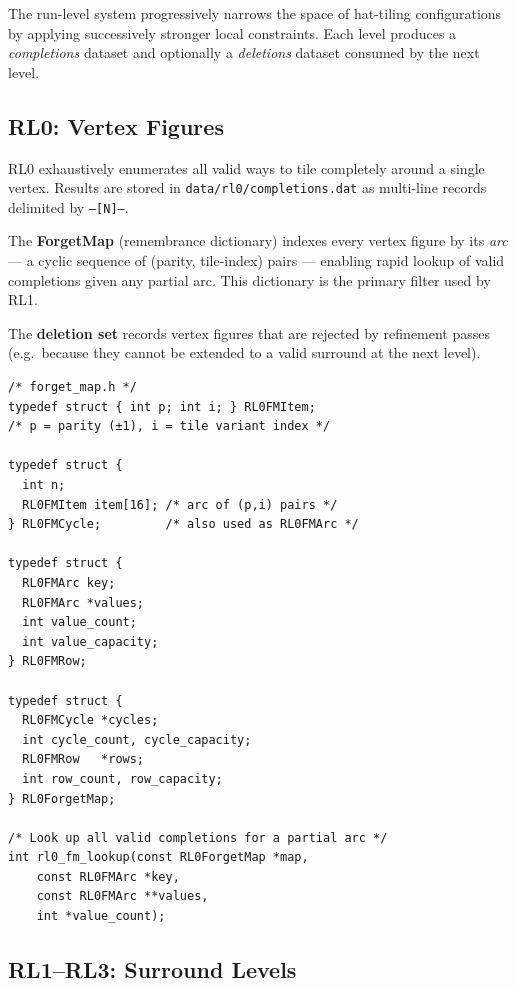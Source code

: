 \documentclass[10pt,a4paper]{article}
\newcommand{\code}[1]{\texttt{\small #1}}
\newcommand{\file}[1]{\texttt{\footnotesize #1}}
\begin{document}
The run-level system progressively narrows the space of hat-tiling
configurations by applying successively stronger local constraints.
Each level produces a \emph{completions} dataset and optionally a
\emph{deletions} dataset consumed by the next level.

\subsection{RL0: Vertex Figures}

\begin{tcolorbox}[dualbox, title=RL0 — Vertex Figure Generation — \file{src/rl0/}]
  RL0 exhaustively enumerates all valid ways to tile completely around
  a single vertex.  Results are stored in \file{data/rl0/completions.dat}
  as multi-line records delimited by \code{---[N]---}.

  The \textbf{ForgetMap} (remembrance dictionary) indexes every
  vertex figure by its \emph{arc} — a cyclic sequence of
  (parity, tile-index) pairs — enabling rapid lookup of valid
  completions given any partial arc.  This dictionary is the primary
  filter used by RL1.

  The \textbf{deletion set} records vertex figures that are rejected
  by refinement passes (e.g.\ because they cannot be extended to a
  valid surround at the next level).
\tcblower
\begin{verbatim}
/* forget_map.h */
typedef struct { int p; int i; } RL0FMItem;
/* p = parity (±1), i = tile variant index */

typedef struct {
  int n;
  RL0FMItem item[16]; /* arc of (p,i) pairs */
} RL0FMCycle;         /* also used as RL0FMArc */

typedef struct {
  RL0FMArc key;
  RL0FMArc *values;
  int value_count;
  int value_capacity;
} RL0FMRow;

typedef struct {
  RL0FMCycle *cycles;
  int cycle_count, cycle_capacity;
  RL0FMRow   *rows;
  int row_count, row_capacity;
} RL0ForgetMap;

/* Look up all valid completions for a partial arc */
int rl0_fm_lookup(const RL0ForgetMap *map,
    const RL0FMArc *key,
    const RL0FMArc **values,
    int *value_count);
\end{verbatim}
\end{tcolorbox}

\subsection{RL1–RL3: Surround Levels}
\end{document}
